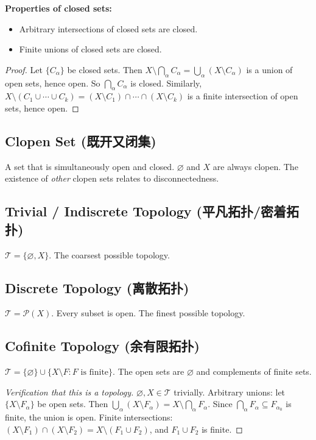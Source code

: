 \documentclass{article}
\begin{document}
\textbf{Properties of closed sets:}
\begin{itemize}
  \item Arbitrary intersections of closed sets are closed.
  \item Finite unions of closed sets are closed.
\end{itemize}
\begin{proof}
  Let $\{C_\alpha\}$ be closed sets. Then $X \setminus \bigcap_\alpha
  C_\alpha = \bigcup_\alpha (X \setminus C_\alpha)$
  is a union of open sets, hence open. So $\bigcap_\alpha C_\alpha$ is closed.
  Similarly, $X \setminus (C_1 \cup \cdots \cup C_k) = (X \setminus
  C_1) \cap \cdots \cap (X \setminus C_k)$
  is a finite intersection of open sets, hence open.
\end{proof}

\subsection{Clopen Set (既开又闭集)}\label{def:clopen}
A set that is simultaneously open and closed.
$\varnothing$ and $X$ are always clopen. The existence of
\emph{other} clopen sets relates to disconnectedness.

\subsection{Trivial / Indiscrete Topology (平凡拓扑/密着拓扑)}\label{def:trivial}
$\mathcal{T} = \{\varnothing, X\}$. The coarsest possible topology.

\subsection{Discrete Topology (离散拓扑)}\label{def:discrete-topo}
$\mathcal{T} = \mathcal{P}(X)$. Every subset is open. The finest
possible topology.

\subsection{Cofinite Topology (余有限拓扑)}\label{def:cofinite}
$\mathcal{T} = \{\varnothing\} \cup \{X \setminus F : F \text{ is
finite}\}$. The open sets are $\varnothing$ and complements of finite sets.

\begin{proof}[Verification that this is a topology]
  $\varnothing, X \in \mathcal{T}$ trivially.
  Arbitrary unions: let $\{X \setminus F_\alpha\}$ be open sets.
  Then $\bigcup_\alpha (X \setminus F_\alpha) = X \setminus
  \bigcap_\alpha F_\alpha$.
  Since $\bigcap_\alpha F_\alpha \subseteq F_{\alpha_0}$ is finite,
  the union is open.
  Finite intersections: $(X \setminus F_1) \cap (X \setminus F_2) = X
  \setminus (F_1 \cup F_2)$,
  and $F_1 \cup F_2$ is finite.
\end{proof}
\end{document}
